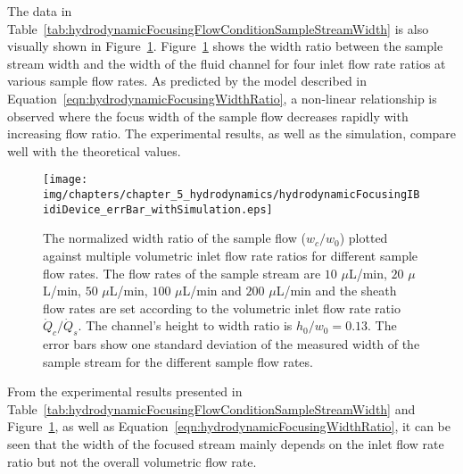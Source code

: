 The data in Table~\ref{tab:hydrodynamicFocusingFlowConditionSampleStreamWidth} is also visually shown in Figure~\ref{fig:hydrodynamicFocusingNormalizedWidth}. Figure~\ref{fig:hydrodynamicFocusingNormalizedWidth} shows the width ratio between the sample stream width and the width of the fluid channel for four inlet flow rate ratios at various sample flow rates. As predicted by the model described in Equation~\ref{eqn:hydrodynamicFocusingWidthRatio}, a non-linear relationship is observed where the focus width of the sample flow decreases rapidly with increasing flow ratio. The experimental results, as well as the simulation, compare well with the theoretical values.

\begin{figure}[htb]
\centering
\texttt{[image: img/chapters/chapter\_5\_hydrodynamics/hydrodynamicFocusingIBidiDevice\_errBar\_withSimulation.eps]}
\caption[Hydrodynamic focusing in iBidi $\mu$-slide: normalized width ratio for different inlet flow rate ratios at various centre inlet flow rates]{The normalized width ratio of the sample flow ($w_{c}/w_{0}$) plotted against multiple volumetric inlet flow rate ratios for different sample flow rates. The flow rates of the sample stream are $10$ $\mu$L/min, $20$ $\mu$L/min, $50$ $\mu$L/min, $100$ $\mu$L/min and $200$ $\mu$L/min and the sheath flow rates are set according to the volumetric inlet flow rate ratio $\dot{Q}_{c}/\dot{Q}_{s}$. The channel's height to width ratio is $h_0/w_0 = 0.13$.
The error bars show one standard deviation of the measured width of the sample stream for the different sample flow rates.}
\label{fig:hydrodynamicFocusingNormalizedWidth}
\end{figure} 

From the experimental results presented in Table~\ref{tab:hydrodynamicFocusingFlowConditionSampleStreamWidth} and Figure~\ref{fig:hydrodynamicFocusingNormalizedWidth}, as well as Equation~\ref{eqn:hydrodynamicFocusingWidthRatio}, it can be seen that the width of the focused stream mainly depends on the inlet flow rate ratio but not the overall volumetric flow rate. 

